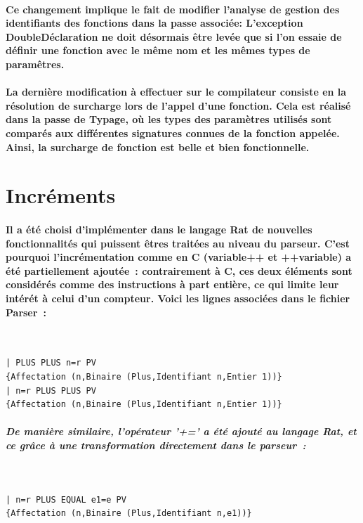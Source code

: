 \documentclass[french]{article}
\begin{document}
\paragraph{Ce changement implique le fait de modifier l'analyse de gestion des identifiants des fonctions dans la passe associée: L'exception DoubleDéclaration
ne doit désormais être levée que si l'on essaie de définir une fonction avec le même nom et les mêmes types de paramêtres.}
\paragraph{La dernière modification à effectuer sur le compilateur consiste en la résolution de surcharge lors de l'appel d'une fonction. Cela est réalisé
dans la passe de Typage, où les types des paramètres utilisés sont comparés aux différentes signatures connues de la fonction appelée. Ainsi, la surcharge
de fonction est belle et bien fonctionnelle.}
\section{Incréments}
\paragraph*{Il a été choisi d'implémenter dans le langage Rat de nouvelles fonctionnalités qui puissent êtres traitées au niveau du parseur. C'est pourquoi
l'incrémentation comme en C (variable++ et ++variable) a été partiellement ajoutée~: contrairement à C, ces deux éléments sont considérés comme
des instructions à part entière, ce qui limite leur intérét à celui d'un compteur. Voici les lignes associées dans le fichier Parser~:}
\,
\begin{lstlisting}
| PLUS PLUS n=r PV 
{Affectation (n,Binaire (Plus,Identifiant n,Entier 1))}
| n=r PLUS PLUS PV 
{Affectation (n,Binaire (Plus,Identifiant n,Entier 1))}
\end{lstlisting}

\subparagraph*{De manière similaire, l'opérateur '+=' a été ajouté au langage Rat, et ce grâce à une transformation directement dans le parseur~:}
\,
\begin{lstlisting}
| n=r PLUS EQUAL e1=e PV 
{Affectation (n,Binaire (Plus,Identifiant n,e1))}
\end{lstlisting}
\end{document}
